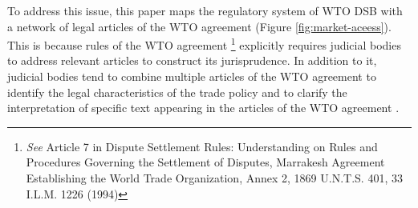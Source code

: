 To address this issue, 
this paper maps 
the regulatory system of WTO DSB 
with a network of legal articles 
of the WTO agreement (Figure \ref{fig:market-aceess}). 
This is because rules of the WTO agreement
\footnote{\textit{See} Article 7 in Dispute Settlement Rules: Understanding on Rules and Procedures Governing the Settlement of Disputes, Marrakesh Agreement Establishing the World Trade Organization, Annex 2, 1869 U.N.T.S. 401, 33 I.L.M. 1226 (1994)} 
explicitly requires judicial bodies to address
relevant articles to construct its jurisprudence.
In addition to it, judicial bodies tend to combine 
multiple articles of the WTO agreement 
to identify the legal characteristics of the trade policy 
and to clarify the interpretation of specific text 
appearing in the articles of the WTO agreement 
\citep{oesch2003standards}.




